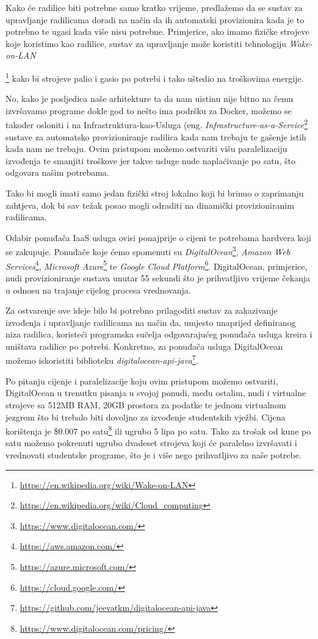 \documentclass[times, utf8, zavrsni]{fer}
\begin{document}
Kako će radilice biti potrebne samo kratko vrijeme, predlažemo da se sustav za upravljanje radilicama doradi na način da ih automatski provizionira kada je to potrebno te ugasi kada više nisu potrebne. Primjerice, ako imamo fizičke strojeve koje koristimo kao radilice, sustav za upravljanje može koristiti tehnologiju {\textit{Wake-on-LAN}}{\footnote{\url{https://en.wikipedia.org/wiki/Wake-on-LAN}} kako bi strojeve palio i gasio po potrebi i tako uštedio na troškovima energije.

		  No, kako je posljedica naše arhitekture ta da nam uistinu nije bitno na čemu izvršavamo programe dokle god to nešto ima podršku za Docker, možemo se također osloniti i na Infrastruktura-kao-Usluga (eng. {\textit{Infrastructure-as-a-Service}}{\footnote{{\url{https://en.wikipedia.org/wiki/Cloud_computing}}}} sustave za automatsko provizioniranje radilica kada nam trebaju te gašenje istih kada nam ne trebaju. Ovim pristupom možemo ostvariti višu paralelizaciju izvođenja te smanjiti troškove jer takve usluge nude naplaćivanje po satu, što odgovara našim potrebama.

Tako bi mogli imati samo jedan fizički stroj lokalno koji bi brinuo o zaprimanju zahtjeva, dok bi sav težak posao mogli odraditi na dinamički provizioniranim radilicama.

Odabir ponuđača IaaS usluga ovisi ponajprije o cijeni te potrebama hardvera koji se zakupuje. Ponuđače koje ćemo spomenuti su {\textit{DigitalOcean}}{\footnote{\url{https://www.digitalocean.com/}}}, {\textit{Amazon Web Services}}{\footnote{\url{https://aws.amazon.com/}}}, {\textit{Microsoft Azure}}{\footnote{\url{https://azure.microsoft.com/}}} te {\textit{Google Cloud Platform}}{\footnote{\url{https://cloud.google.com/}}}. DigitalOcean, primjerice, nudi provizioniranje sustava unutar 55 sekundi što je prihvatljivo vrijeme čekanja u odnosu na trajanje cijelog procesa vrednovanja.

Za ostvarenje ove ideje bilo bi potrebno prilagoditi sustav za zakazivanje izvođenja i upravljanje radilicama na način da, umjesto unaprijed definiranog niza radilica, koristeći programska sučelja odgovarajućeg ponuđača usluga kreira i uništava radilice po potrebi. Konkretno, za ponuđača usluga DigitalOcean možemo iskoristiti biblioteku {\textit{digitalocean-api-java}}{\footnote{\url{https://github.com/jeevatkm/digitalocean-api-java}}}.

Po pitanju cijenje i paralelizacije koju ovim pristupom možemo ostvariti, DigitalOcean u trenutku pisanja u svojoj ponudi, među ostalim, nudi i virtualne strojeve sa 512MB RAM, 20GB prostora za podatke te jednom virtualnom jezgrom što bi trebalo biti dovoljno za izvođenje studentskih vježbi. Cijena korištenja je \$0.007 po satu{\footnote{\url{https://www.digitalocean.com/pricing/}}} ili ugrubo 5 lipa po satu. Tako za trošak od kune po satu možemo pokrenuti ugrubo dvadeset strojeva koji će paralelno izvršavati i vrednovati studentske programe, što je i više nego prihvatljivo za naše potrebe.


}
\end{document}
